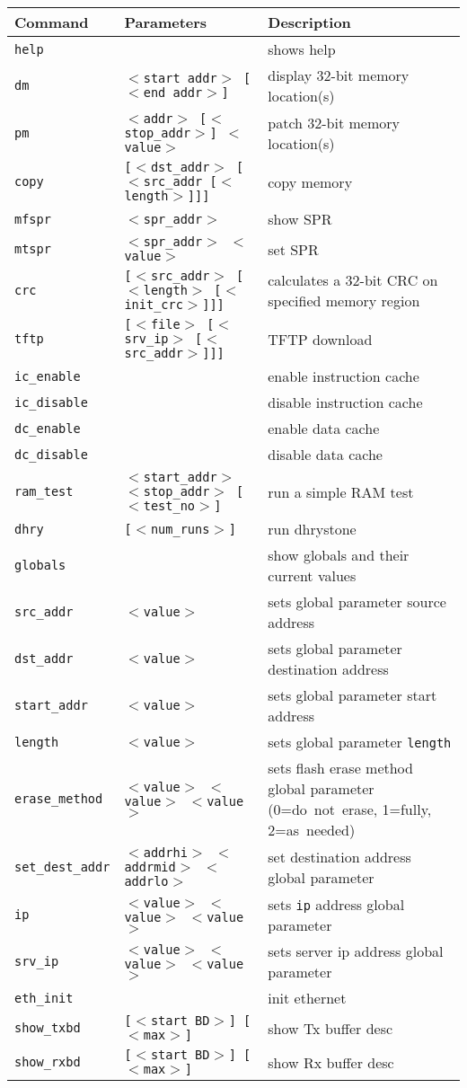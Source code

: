 \topmargin -2cm
\textwidth 19cm
\textheight 28cm
\hoffset -2cm



\newcommand{\addorpcmd}[3]{{\small\tt#1}\hfil&{\small\tt #2}\hfil&{\small\rm#3}\hfil\\}
\thispagestyle{empty}
\begin{centering}
\noindent
\begin{tabular}{lp{5cm}p{7cm}}\hline
{\bf Command} & {\bf Parameters} & {\bf Description} \\ \hline\hline
\addorpcmd{help}{}{shows help}
\addorpcmd{dm}{$<$start addr$>$ [$<$end addr$>$]}{display 32-bit memory location(s)}
\addorpcmd{pm}{$<$addr$>$ [$<$stop\_addr$>$] $<$value$>$}{patch 32-bit memory location(s)}
\addorpcmd{copy}{[$<$dst\_addr$>$ [$<$src\_addr [$<$length$>$]]]}{copy memory}
\addorpcmd{mfspr}{$<$spr\_addr$>$}{show SPR}
\addorpcmd{mtspr}{$<$spr\_addr$>$ $<$value$>$}{set SPR}
\hline
\addorpcmd{crc}{[$<$src\_addr$>$ [$<$length$>$ [$<$init\_crc$>$]]]}{calculates a 32-bit CRC on specified memory region}
\addorpcmd{tftp}{[$<$file$>$ [$<$srv\_ip$>$ [$<$src\_addr$>$]]]}{TFTP download}
\addorpcmd{ic\_enable}{}{enable instruction cache}
\addorpcmd{ic\_disable}{}{disable instruction cache}
\addorpcmd{dc\_enable}{}{enable data cache}
\addorpcmd{dc\_disable}{}{disable data cache}
\addorpcmd{ram\_test}{$<$start\_addr$>$ $<$stop\_addr$>$ [$<$test\_no$>$]}{run a simple RAM test}
\addorpcmd{dhry}{[$<$num\_runs$>$]}{run dhrystone}
\hline
\addorpcmd{globals}{}{show globals and their current values}
\addorpcmd{src\_addr}{$<$value$>$}{sets global parameter source address}
\addorpcmd{dst\_addr}{$<$value$>$}{sets global parameter destination address}
\addorpcmd{start\_addr}{$<$value$>$}{sets global parameter start address}
\addorpcmd{length}{$<$value$>$}{sets global parameter {\tt length}}
\addorpcmd{erase\_method}{$<$value$>$ $<$value$>$ $<$value$>$}{sets flash erase method global parameter (0=do~not~erase, 1=fully, 2=as~needed)}
\addorpcmd{set\_dest\_addr}{$<$addrhi$>$ $<$addrmid$>$ $<$addrlo$>$}{set destination address global parameter}
\addorpcmd{ip}{$<$value$>$ $<$value$>$ $<$value$>$}{sets {\tt ip} address global parameter}
\addorpcmd{srv\_ip}{$<$value$>$ $<$value$>$ $<$value$>$}{sets server ip address global parameter}
\hline
\addorpcmd{eth\_init}{}{init ethernet}
\addorpcmd{show\_txbd}{[$<$start BD$>$] [$<$max$>$]}{show Tx buffer desc}
\addorpcmd{show\_rxbd}{[$<$start BD$>$] [$<$max$>$]}{show Rx buffer desc}

\end{tabular}
\end{centering}
